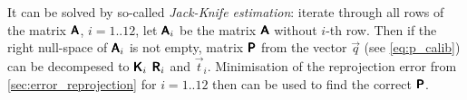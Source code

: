 It can be solved by so-called \textit{Jack-Knife estimation}: iterate through all rows of the matrix $\pmb{\mathsf{A}}$, $i = 1..12$, let $\pmb{\mathsf{A}}_i$ be the matrix $\pmb{\mathsf{A}}$ without $i$-th row.
Then if the right null-space of $\pmb{\mathsf{A}}_i$ is not empty, matrix $\pmb{\mathsf{P}}$ from the vector $\vec{q}$ (see \eqref{eq:p_calib}) can be decompesed to $\pmb{\mathsf{K}}_i$ $\pmb{\mathsf{R}}_i$ and $\vec{t}_i$.
Minimisation of the reprojection error from \autoref{sec:error_reprojection} for $i = 1..12$ then can be used to find the correct $\pmb{\mathsf{P}}$.


